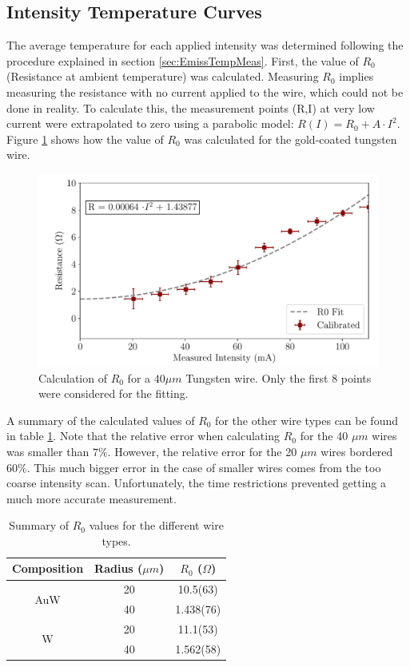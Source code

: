\subsection{Intensity Temperature Curves}

The average temperature for each applied intensity was determined following the procedure explained in section \ref{sec:EmissTempMeas}. First, the value of $R_0$ (Resistance at ambient temperature) was calculated. Measuring $R_0$ implies measuring the resistance with no current applied to the wire, which could not be done in reality. To calculate this, the measurement points (R,I) at very low current were extrapolated to zero using a parabolic model: $R(I) = R_{0} + A\cdot I^2$. Figure \ref{fig:R0Calc} shows how the value of $R_0$ was calculated for the gold-coated tungsten wire. 

\begin{figure}[h!]
    \centering
    \includegraphics[width=0.8\columnwidth]{Figure_CalculateR0/CalcR0.pdf}
    \caption{Calculation of $R_0$ for a $40 \mu m$ Tungsten wire. Only the first 8 points were considered for the fitting. }
    \label{fig:R0Calc}
\end{figure}

A summary of the calculated values of $R_0$ for the other wire types can be found in table \ref{tab:R0table}. Note that the relative error when calculating $R_0$ for the 40 $\mu m$ wires was smaller than $7\%$. However, the relative error for the 20 $\mu m$ wires bordered $60 \%$. This much bigger error in the case of smaller wires comes from the too coarse intensity scan. Unfortunately, the time restrictions prevented getting a much more accurate measurement. 

\begin{table}[h]
    \centering
    \begin{tabular}{ccc}
    \hline
    Composition          & Radius ($\mu m$) & $R_0$ ($\Omega$) \\ \hline
    \multirow{2}{*}{AuW} & 20               & 10.5(63)         \\
                         & 40               & 1.438(76)        \\
    \multirow{2}{*}{W}   & 20               & 11.1(53)         \\
                         & 40               & 1.562(58)        \\ \hline
    \end{tabular}
    \caption{Summary of $R_0$ values for the different wire types. }
    \label{tab:R0table}
\end{table}

